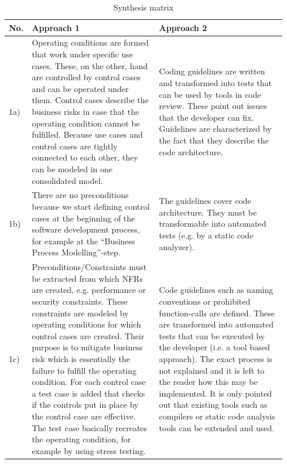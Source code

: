 \begin{small}
\begin{longtable}[H]{p{0.03\linewidth}|p{0.455\linewidth}|p{0.455\linewidth}}
	\caption{Synthesis matrix}
	\\
	\hline
	\textbf{No.} & \textbf{Approach 1 \cite{ZouPavlovski2008}} & \textbf{Approach 2 \cite{Lagerstedt2014}} \\
	\hline
	1a) & 
	Operating conditions are formed that work under specific use cases.
	These, on the other, hand are controlled by control cases and can be operated under them.
	Control cases describe the business risks in case that the operating condition cannot be fulfilled.
	Because use cases and control cases are tightly connected to each other, they can be modeled in one consolidated model.
	& 
	
	Coding guidelines are written and transformed into tests that can be used by tools in code review.
	These point out issues that the developer can fix.
	Guidelines are characterized by the fact that they describe the code architecture.
	\\
	\hline
	1b) & 
	There are no preconditions because we start defining control cases at the beginning of the software development process, for example at the \enquote{Business Process Modelling}-step.
	
	&
	The guidelines cover code architecture. They must be transformable into automated tests (e.g. by a static code analyzer).
	
	\\
	\hline
	
	1c) &
	Preconditions/Constraints must be extracted from which NFRs are created, e.g. performance or security constraints.
	These constraints are modeled by operating conditions for which control cases are created.
	Their purpose is to mitigate business risk which is essentially the failure to fulfill the operating condition.
	For each control case a test case is added that checks if the controls put in place by the control case are effective.
	The test case basically recreates the operating condition, for example by using stress testing.
	
	&
	Code guidelines such as naming conventions or prohibited function-calls are defined.
	These are transformed into automated tests that can be executed by the developer (i.e. a tool based approach).
	The exact process is not explained and it is left to the reader how this may be implemented.
	It is only pointed out that existing tools such as compilers or static code analysis tools can be extended and used.
	\\
	\hline
	

\end{longtable}
\end{small}
